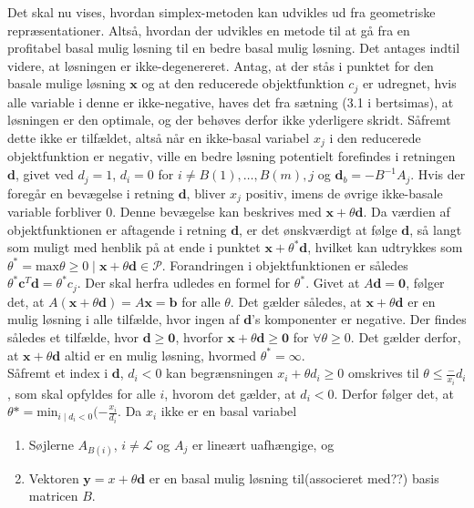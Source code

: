 Det skal nu vises, hvordan simplex-metoden kan udvikles ud fra geometriske repræsentationer.
Altså, hvordan der udvikles en metode til at gå fra en profitabel basal mulig løsning til en bedre basal mulig løsning.
Det antages indtil videre, at løsningen er ikke-degenereret.
Antag, at der stås i punktet for den basale mulige løsning $\mathbf{x}$ og at den reducerede objektfunktion $c_j$ er udregnet, hvis alle variable i denne er ikke-negative, haves det fra sætning (3.1 i bertsimas), at løsningen er den optimale, og der behøves derfor ikke yderligere skridt.
Såfremt dette ikke er tilfældet, altså når en ikke-basal variabel $x_j$ i den reducerede objektfunktion er negativ, ville en bedre løsning potentielt forefindes i retningen $\mathbf{d}$, givet ved  $d_j=1$, $d_i=0$ for $i \neq B(1),\ldots,B(m),j$ og $\mathbf{d}_b=-B^{-1}A_j$.
Hvis der foregår en bevægelse i retning $\mathbf{d}$, bliver $x_j$ positiv, imens de øvrige ikke-basale variable forbliver $0$.
Denne bevægelse kan beskrives med $\mathbf{x}+\theta \mathbf{d}$. 
Da værdien af objektfunktionen er aftagende i retning $\mathbf{d}$, er det ønskværdigt at følge $\mathbf{d}$, så langt som muligt med henblik på at ende i punktet $\mathbf{x}+\theta^{*} \mathbf{d}$, hvilket kan udtrykkes som 
$\theta^{*}=\text{max} \theta \geq 0 \mid \mathbf{x}+\theta \mathbf{d} \in \mathcal{P}$.
Forandringen i objektfunktionen er således $\theta^{*}\mathbf{c}^T \mathbf{d}=\theta^{*}c_j$.
Der skal herfra udledes en formel for $\theta^{*}$.
Givet at $A\mathbf{d}=\mathbf{0}$, følger det, at $A(\mathbf{x}+\theta \mathbf{d})=A\mathbf{x}=\mathbf{b}$ for alle $\theta$.
Det gælder således, at $\mathbf{x}+\theta\mathbf{d}$ er en mulig løsning i alle tilfælde, hvor ingen af $\mathbf{d}$'s komponenter er negative.
Der findes således et tilfælde, hvor $\mathbf{d} \geq \mathbf{0}$, hvorfor $\mathbf{x} + \theta \mathbf{d} \geq \mathbf{0}$ for $\forall\theta \geq 0$. 
Det gælder derfor, at $\mathbf{x} + \theta \mathbf{d} $ altid er en mulig løsning, hvormed $\theta^*=\infty$. \\
Såfremt et index i $\mathbf{d}$, $d_i<0$ kan begrænsningen $x_i + \theta d_i \geq 0$ omskrives til $\theta \leq \frac-{x_i}{d_i}$, som skal opfyldes for alle $i$, hvorom det gælder, at $d_i<0$.
Derfor følger det, at $\theta*=\text{min}_{i \mid d_i<0}(-\frac{x_i}{d_i}$.
Da $x_i$ ikke er en basal variabel 
\begin{thm}{}{}
\begin{enumerate}[label = (\alph*)]
\item Søjlerne $A_{B(i)}$, $i \neq \mathcal{L}$ og $A_j$ er lineært uafhængige, og 
\item Vektoren $\mathbf{y}=x+ \theta \mathbf{d}$ er en basal mulig løsning til(associeret med??) basis matricen $B$.
\end{enumerate}
\end{thm}
